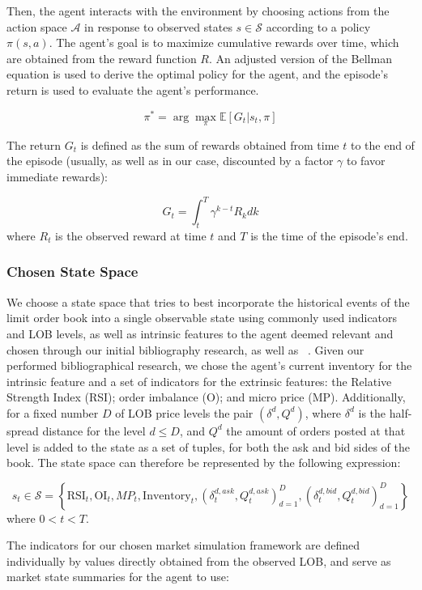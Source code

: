 Then, the agent interacts with the environment by choosing actions from the action space $\mathcal{A}$ in response to observed states $s \in \mathcal{S}$ according to a policy $\pi (s, a)$.
The agent's goal is to maximize cumulative rewards over time, which are obtained from the reward function $R$.
An adjusted version of the Bellman equation is used to derive the optimal policy for the agent, and the episode's return is used to evaluate the agent's performance.

\[
    \pi^{*} = \arg \max_{\pi} \mathbb{E} \left[ G_t | s_t, \pi \right]
\]

The return $G_t$ is defined as the sum of rewards obtained from time $t$ to the end of the episode (usually, as well as in our case, discounted by a factor $\gamma$ to favor immediate rewards):

\[
    G_t = \int_{t}^{T} \gamma^{k-t} R_{k} dk
\]
where $R_{t}$ is the observed reward at time $t$ and $T$ is the time of the episode's end.

\subsubsection{Chosen State Space}
We choose a state space that tries to best incorporate the historical events of the limit order book into a single observable state using commonly used indicators and LOB levels,
as well as intrinsic features to the agent deemed relevant and chosen through our initial bibliography research, as well as ~\cite{Gasperov2021}.
Given our performed bibliographical research, we chose the agent's current inventory for the intrinsic feature and a set of indicators for the extrinsic features:
the Relative Strength Index (RSI); order imbalance (O); and micro price (MP).
Additionally, for a fixed number $D$ of LOB price levels the pair $(\delta^d, Q^d)$, where $\delta^d$ is the half-spread distance for the level $d \leq D$,
and $Q^d$ the amount of orders posted at that level is added to the state as a set of tuples, for both the ask and bid sides of the book.
The state space can therefore be represented by the following expression:

\[
    s_{t} \in \mathcal{S} = \left\{ \text{RSI}_t, \text{OI}_t, MP_{t}, \text{Inventory}_t, \left( \delta_t^{d, ask}, Q_t^{d, ask} \right)_{d=1}^{D}, \left( \delta_t^{d, bid}, Q_t^{d, bid} \right)_{d=1}^{D} \right\}
\]
where $0 < t < T$.

The indicators for our chosen market simulation framework are defined individually by values directly obtained from the observed LOB,
and serve as market state summaries for the agent to use:

